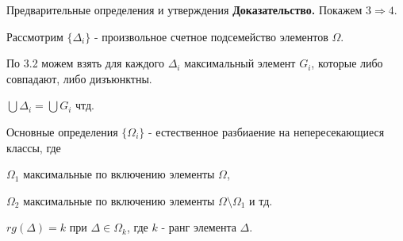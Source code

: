 \documentclass{beamer}
\begin{document}
% 
% 
% 
\begin{frame}{Предварительные определения и утверждения}
    \textbf{Доказательство.} Покажем $3 \Rightarrow 4$.
    \newline
      
    Рассмотрим $\{\Delta_i\}$ - произвольное счетное подсемейство элементов $\Omega$.
    
    По 3.2 можем взять для каждого $\Delta_i$ максимальный элемент $G_i$,
    которые либо совпадают, либо дизъюнктны.
    
    $\bigcup \Delta_i = \bigcup G_i$ чтд.
\end{frame}


%
\begin{frame}{Основные определения}
    $\{\Omega_i\}$ - естественное разбиаение на непересекающиеся классы, где
    
    $\Omega_1$ максимальные по включению элементы $\Omega$,
    
    $\Omega_2$ максимальные по включению элементы $\Omega {\setminus}{ \Omega_1}$ и тд.
    
    $rg(\Delta)=k$ при $\Delta\in\Omega_k$, где $k$ - ранг элемента $\Delta$.
\end{frame}
\end{document}
